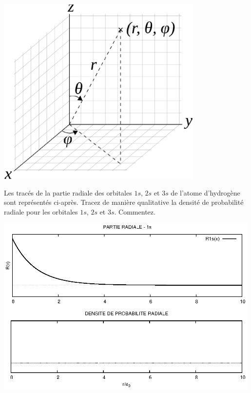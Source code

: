 
\begin{center}
\includegraphics[height=9.5cm]{figure/spheriques_ok.eps}\\
\end{center}


Les trac\'es de la partie radiale des orbitales $1s$, $2s$ et $3s$ de l'atome d'hydrog\`ene 
sont repr\'esent\'es ci-apr\`es.
Tracez de mani\`ere qualitative la densit\'e de probabilit\'e radiale pour les orbitales
$1s$, $2s$ et $3s$. Commentez. 

\begin{center}
\includegraphics[angle=90,width=0.99\textwidth]{figure/rad1s.eps}
\end{center}

